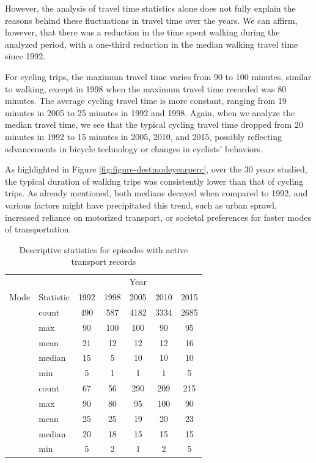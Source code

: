 \documentclass[preprint, 3p,
authoryear]{elsarticle} %
\begin{document}
However, the analysis of travel time statistics alone does not fully
explain the reasons behind these fluctuations in travel time over the
years. We can affirm, however, that there was a reduction in the time
spent walking during the analyzed period, with a one-third reduction in
the median walking travel time since 1992.

For cycling trips, the maximum travel time varies from 90 to 100
minutes, similar to walking, except in 1998 when the maximum travel time
recorded was 80 minutes. The average cycling travel time is more
constant, ranging from 19 minutes in 2005 to 25 minutes in 1992 and
1998. Again, when we analyze the median travel time, we see that the
typical cycling travel time dropped from 20 minutes in 1992 to 15
minutes in 2005, 2010, and 2015, possibly reflecting advancements in
bicycle technology or changes in cyclists' behaviors.

As highlighted in Figure \ref{fig:figure-destmodeyearperc}, over the 30
years studied, the typical duration of walking trips was consistently
lower than that of cycling trips. As already mentioned, both medians
decayed when compared to 1992, and various factors might have
precipitated this trend, such as urban sprawl, increased reliance on
motorized transport, or societal preferences for faster modes of
transportation.

\begingroup\fontsize{10}{12}\selectfont

\begin{longtable}[t]{>{}llccccc}
\caption{\label{tab:table-02}\label{tab:table-02}Descriptive statistics for episodes with active transport records}\\
\toprule
\multicolumn{2}{c}{ } & \multicolumn{5}{c}{Year} \\
\cmidrule(l{3pt}r{3pt}){3-7}
Mode & Statistic & 1992 & 1998 & 2005 & 2010 & 2015\\
\midrule
 & count & 490 & 587 & 4182 & 3334 & 2685\\
\nopagebreak
 & max & 90 & 100 & 100 & 90 & 95\\
\nopagebreak
 & mean & 21 & 12 & 12 & 12 & 16\\
\nopagebreak
 & median & 15 & 5 & 10 & 10 & 10\\
\nopagebreak
\multirow[t]{-5}{*}{\raggedright\arraybackslash \textbf{Walking}} & min & 5 & 1 & 1 & 1 & 5\\
\cmidrule{1-7}\pagebreak[0]
 & count & 67 & 56 & 290 & 209 & 215\\
\nopagebreak
 & max & 90 & 80 & 95 & 100 & 90\\
\nopagebreak
 & mean & 25 & 25 & 19 & 20 & 23\\
\nopagebreak
 & median & 20 & 18 & 15 & 15 & 15\\
\nopagebreak
\multirow[t]{-5}{*}{\raggedright\arraybackslash \textbf{Cycling}} & min & 5 & 2 & 1 & 2 & 5\\
\bottomrule
\end{longtable}
\endgroup{}
\end{document}
